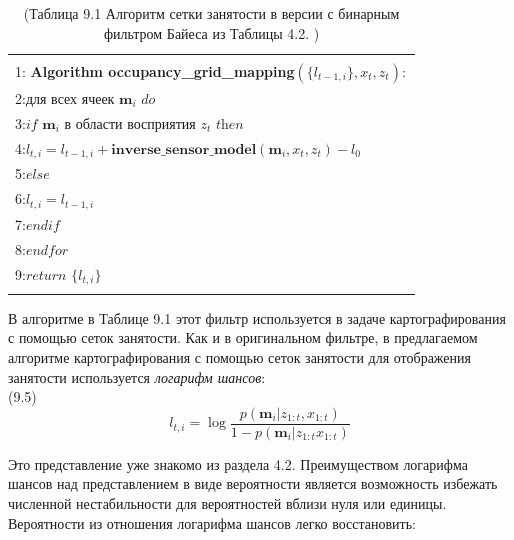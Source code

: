\documentclass[10pt,a4paper]{article}
\begin{document}
\begin{table}[H]
\begin{center}
\begin{tabular}{|l|}
\hline
{}\\
1: \textbf{Algorithm occupancy\_grid\_mapping}$(\{l_{t-1,i}\},x_t,z_t):$ \\
2:\hspace{5mm}$\textit{для всех ячеек}\,\,\textbf{m}_i\,\,\textit{do}$\\
3:\hspace{10mm}$\textit{if}\,\,\textbf{m}_i\,\,\textit{в области восприятия}\,\,z_t\,\,\textit{then}$\\
4:\hspace{15mm}$l_{t,i}=l_{t-1,i}+\textbf{inverse\_sensor\_model}(\textbf{m}_i,x_t,z_t)-l_0$\\
5:\hspace{10mm}$\textit{else}$\\
6:\hspace{15mm}$l_{t,i}=l_{t-1,i}$\\
7:\hspace{10mm}$\textit{endif}$\\
8:\hspace{5mm}$\textit{endfor}$\\
9:\hspace{5mm}$\textit{return}\,\,\{l_{t,i}\}$\\
{}\\
\hline
\end{tabular}
\caption{(Таблица 9.1 Алгоритм сетки занятости в версии с бинарным фильтром Байеса из Таблицы 4.2. )}
\end{center}
\end{table}

В алгоритме в Таблице 9.1 этот фильтр используется в задаче картографирования с помощью сеток занятости. Как и в оригинальном фильтре, в предлагаемом алгоритме картографирования с помощью сеток занятости для отображения занятости используется \textit{логарифм шансов}:\\

(9.5)
$$l_{t,i}=\log\frac{p(\textbf{m}_i|z_{1:t},x_{1:t})}{1-p(\textbf{m}_i|z_{1:t}x_{1:t})}$$

Это представление уже знакомо из раздела 4.2. Преимуществом логарифма шансов над представлением в виде вероятности является возможность избежать численной нестабильности для вероятностей вблизи нуля или единицы. Вероятности из отношения логарифма шансов легко восстановить:\\
\end{document}
